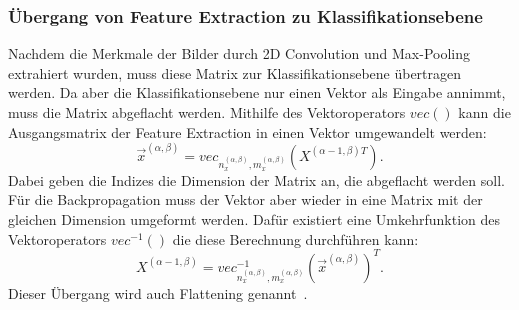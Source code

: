 \documentclass[11pt]{article}
\begin{document}
\subsubsection{Übergang von Feature Extraction zu Klassifikationsebene}
Nachdem die Merkmale der Bilder durch 2D Convolution und Max-Pooling extrahiert wurden, muss diese Matrix zur Klassifikationsebene übertragen werden.
Da aber die Klassifikationsebene nur einen Vektor als Eingabe annimmt, muss die Matrix abgeflacht werden. Mithilfe des Vektoroperators $vec()$ kann die
Ausgangsmatrix der Feature Extraction in einen Vektor umgewandelt werden:
\begin{equation}
    \vec{x}^{(\alpha,\beta)} = vec_{n_{x}^{(\alpha,\beta)}, m_{x}^{(\alpha,\beta)}}(X^{(\alpha-1,\beta)T}).
\end{equation}
Dabei geben die Indizes die Dimension der Matrix an, die abgeflacht werden soll. Für die Backpropagation muss der Vektor aber wieder in eine Matrix mit
der gleichen Dimension umgeformt werden. Dafür existiert eine Umkehrfunktion des Vektoroperators $vec^{-1}()$ die diese Berechnung durchführen kann:
\begin{equation}
    X^{(\alpha-1,\beta)} = vec^{-1}_{n_{x}^{(\alpha,\beta)}, m_{x}^{(\alpha,\beta)}}{(\vec{x}^{(\alpha,\beta)})}^{T}.
\end{equation}
Dieser Übergang wird auch Flattening genannt~\cite{18}.
\end{document}
